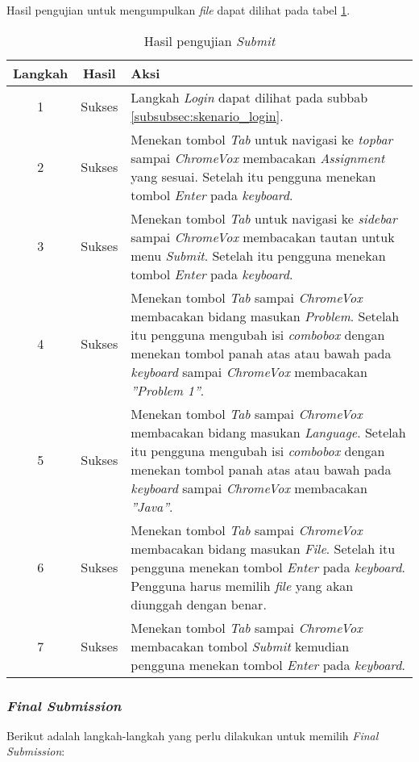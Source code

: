 Hasil pengujian untuk mengumpulkan \textit{file} dapat dilihat pada tabel \ref{tab:hasil_submit}.

\begin{table}[H]
	\centering
	\caption{Hasil pengujian \textit{Submit}}
	\label{tab:hasil_submit}
	\begin{tabular}{|c|c|p{12cm}|}
		\toprule
		Langkah & Hasil & Aksi\\
		\midrule
		1 & Sukses & Langkah \textit{Login} dapat dilihat pada subbab \ref{subsubsec:skenario_login}.\\
		2 & Sukses & Menekan tombol \textit{Tab} untuk navigasi ke \textit{topbar} sampai \textit{ChromeVox} membacakan \textit{Assignment} yang sesuai. Setelah itu pengguna menekan tombol \textit{Enter} pada \textit{keyboard}.\\
		3 & Sukses & Menekan tombol \textit{Tab} untuk navigasi ke \textit{sidebar} sampai \textit{ChromeVox} membacakan tautan untuk menu \textit{Submit}. Setelah itu pengguna menekan tombol \textit{Enter} pada \textit{keyboard}.\\
		4 & Sukses & Menekan tombol \textit{Tab} sampai \textit{ChromeVox} membacakan bidang masukan \textit{Problem}. Setelah itu pengguna mengubah isi \textit{combobox} dengan menekan tombol panah atas atau bawah pada \textit{keyboard} sampai \textit{ChromeVox} membacakan \textit{''Problem 1''}.\\
		5 & Sukses & Menekan tombol \textit{Tab} sampai \textit{ChromeVox} membacakan bidang masukan \textit{Language}. Setelah itu pengguna mengubah isi \textit{combobox} dengan menekan tombol panah atas atau bawah pada \textit{keyboard} sampai \textit{ChromeVox} membacakan \textit{''Java''}.\\
		6 & Sukses & Menekan tombol \textit{Tab} sampai \textit{ChromeVox} membacakan bidang masukan \textit{File}. Setelah itu pengguna menekan tombol \textit{Enter} pada \textit{keyboard}. Pengguna harus memilih \textit{file} yang akan diunggah dengan benar.\\
		7 & Sukses & Menekan tombol \textit{Tab} sampai \textit{ChromeVox} membacakan tombol \textit{Submit} kemudian pengguna menekan tombol \textit{Enter} pada \textit{keyboard}.\\
		\bottomrule
	\end{tabular}
\end{table}

\subsubsection{\textit{Final Submission}}
\label{subsubsec:skenario_final_submission}
Berikut adalah langkah-langkah yang perlu dilakukan untuk memilih \textit{Final Submission}:

